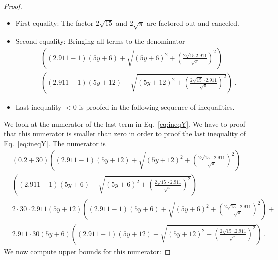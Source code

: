 \documentclass{article}
\begin{document}
\begin{proof}
\begin{itemize}
\item First equality: The factor $2 \sqrt{15}$ and $2 \sqrt{\pi}$
  are factored out and canceled.

\item Second equality: Bringing all terms to the denominator
\begin{align}
&\left((2.911 -1) (5 y+6)+\sqrt{(5 y+6)^2+\left(\frac{2 \sqrt{15}
  2.911}{\sqrt{\pi }}\right)^2}\right) \\ \nonumber & \left((2.911-1) (5 y+12)+\sqrt{(5 y+12)^2+\left(\frac{2 \sqrt{15} \cdot 2.911}{\sqrt{\pi }}\right)^2}\right) \ .
\end{align}

\item Last inequality $<0$ is proofed in the following sequence of
  inequalities.
\end{itemize}
We look at the numerator of the last term in Eq.~\eqref{eq:ineqY}. We
have to proof that this numerator is smaller than zero in order to
proof the last inequality of  Eq.~\eqref{eq:ineqY}.
The numerator is
\begin{align}
&(0.2 +30) \left((2.911 -1) (5 y+12)+\sqrt{(5 y+12)^2+\left(\frac{2 \sqrt{15} \cdot 2.911}{\sqrt{\pi }}\right)^2}\right) \\ \nonumber & \left((2.911 -1) (5 y+6)+\sqrt{(5 y+6)^2+\left(\frac{2 \sqrt{15} \cdot 2.911}{\sqrt{\pi }}\right)^2}\right)\ - \\ \nonumber &2 \cdot 30 \cdot 2.911 (5 y+12) \left((2.911 -1) (5 y+6)+\sqrt{(5 y+6)^2+\left(\frac{2 \sqrt{15} \cdot 2.911}{\sqrt{\pi }}\right)^2}\right)+ \\ \nonumber &2.911 \cdot 30 (5 y+6) \left((2.911 -1) (5 y+12)+\sqrt{(5 y+12)^2+\left(\frac{2 \sqrt{15} \ . 2.911}{\sqrt{\pi }}\right)^2}\right) \ .
\end{align}
We now compute upper bounds for this numerator:


\end{proof}
\end{document}
